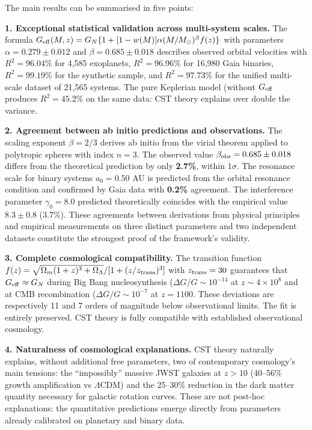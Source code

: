 \documentclass[11pt,a4paper]{article}
\begin{document}
The main results can be summarised in five points:

\textbf{1. Exceptional statistical validation across multi-system
scales.} The formula
\(G_{\rm eff}(M,z) = G_N\{1 + [1-w(M)]\alpha(M/M_\odot)^\beta f(z)\}\)
with parameters \(\alpha = 0.279 \pm 0.012\) and
\(\beta = 0.685 \pm 0.018\) describes observed orbital velocities with
\(R^2 = 96.04\%\) for 4,585 exoplanets, \(R^2 = 96.96\%\) for 16,980
Gaia binaries, \(R^2 = 99.19\%\) for the synthetic sample, and
\(R^2 = 97.73\%\) for the unified multi-scale dataset of 21,565 systems.
The pure Keplerian model (without \(G_{\rm eff}\) produces
\(R^2 = 45.2\%\) on the same data: CST theory explains over double the
variance.

\textbf{2. Agreement between ab initio predictions and observations.}
The scaling exponent \(\beta = 2/3\) derives ab initio from the virial
theorem applied to polytropic spheres with index \(n=3\). The observed
value \(\beta_{\rm obs} = 0.685 \pm 0.018\) differs from the theoretical
prediction by only \textbf{2.7\%}, within \(1\sigma\). The resonance
scale for binary systems \(a_0 = 0.50\) AU is predicted from the orbital
resonance condition and confirmed by Gaia data with \textbf{0.2\%}
agreement. The interference parameter \(\gamma_0 = 8.0\) predicted
theoretically coincides with the empirical value \(8.3 \pm 0.8\)
(3.7\%). These agreements between derivations from physical principles
and empirical measurements on three distinct parameters and two
independent datasets constitute the strongest proof of the framework's
validity.

\textbf{3. Complete cosmological compatibility.} The transition function
\(f(z) = \sqrt{\Omega_m(1+z)^3 + \Omega_\Lambda}/[1+(z/z_{\rm trans})^3]\)
with \(z_{\rm trans} = 30\) guarantees that \(G_{\rm eff} \approx G_N\)
during Big Bang nucleosynthesis (\(\Delta G/G \sim 10^{-14}\) at
\(z \sim 4\times10^8\) and at CMB recombination
(\(\Delta G/G \sim 10^{-7}\) at \(z = 1100\). These deviations are
respectively 11 and 7 orders of magnitude below observational limits.
The \cite{PlanckCollaboration2020a} fit is entirely preserved. CST theory is fully
compatible with established observational cosmology.

\textbf{4. Naturalness of cosmological explanations.} CST theory
naturally explains, without additional free parameters, two of
contemporary cosmology's main tensions: the ``impossibly'' massive JWST
galaxies at \(z > 10\) (40--56\% growth amplification vs \(\Lambda\)CDM)
and the 25--30\% reduction in the dark matter quantity necessary for
galactic rotation curves. These are not post-hoc explanations: the
quantitative predictions emerge directly from parameters already
calibrated on planetary and binary data.
\end{document}
